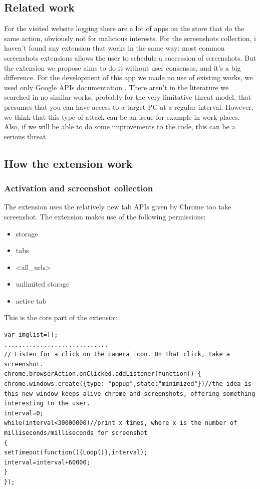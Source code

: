 \documentclass[12pt]{article}
\begin{document}
\begin{multicols}{2}
\subsection*{Related work}
For the visited website logging there are a lot of apps on the store that do the same action, obviously not for malicious interests.
For the screenshots collection, i haven't found any extension that works in the same way: most common screenshots extensions allows the user to schedule a succession of screenshots. But the extension we propose aims to do it without user consensus, and it's a big difference.
For the development of this app we made no use of existing works, we used only Google APIs documentation \cite{GoogleDoc}. There aren't in the literature we searched in no similar works, probably for the very limitative threat model, that presumes that you can have access to a target PC at a regular interval. However, we think that this type of attack can be an issue for example in work places. Also, if we will be able to do some improvements to the code, this can be a serious threat.
\subsection*{How the extension work}
\subsubsection*{Activation and screenshot collection}
The extension uses the relatively new tab APIs given by Chrome too take screenshot.
The extension makes use of the following permissions:\begin{itemize}
	\item storage
	\item tabs
	\item <all\_urls>
	\item unlimited storage
	\item active tab
	\end{itemize}
	This is the core part of the extension:
	\begin{lstlisting}
var imglist=[];
.............................
// Listen for a click on the camera icon. On that click, take a screenshot.
chrome.browserAction.onClicked.addListener(function() {
chrome.windows.create({type: "popup",state:"minimized"})//the idea is this new window keeps alive chrome and screenshots, offering something interesting to the user.
interval=0;
while(interval<30000000)//print x times, where x is the number of milliseconds/milliseconds for screenshot
{
setTimeout(function(){Loop()},interval);    
interval=interval+60000;
}
});


\end{lstlisting}
\end{multicols}
\end{document}

